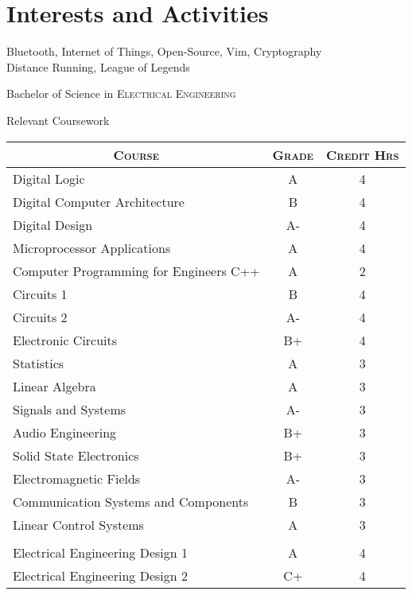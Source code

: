 \documentclass[a4paper,10pt]{article} %
\begin{document}
\section{Interests and Activities}

Bluetooth, Internet of Things, Open-Source, Vim, Cryptography\\
Distance Running, League of Legends


\newpage


\par{\centering\Large \hypertarget{grds}{Bachelor of Science in \textsc{Electrical Engineering}}\par}\large{\centering Relevant Coursework\par}\normalsize

\begin{center}
\begin{tabular}{lcc}
\multicolumn{1}{c}{\textsc{Course}} & \textsc{Grade}&\textsc{Credit Hrs}\\ \hline
Digital Logic & A & 4\\
Digital Computer Architecture & B & 4\\
Digital Design & A- & 4\\
Microprocessor Applications & A & 4\\
Computer Programming for Engineers C++ & A & 2\\
Circuits 1 & B & 4\\
Circuits 2 & A- & 4 \\
Electronic Circuits & B+ & 4\\
Statistics & A & 3\\
Linear Algebra & A & 3\\
Signals and Systems & A- & 3\\
Audio Engineering & B+ & 3\\
Solid State Electronics & B+ & 3\\
Electromagnetic Fields & A- & 3\\
Communication Systems and Components & B & 3\\
Linear Control Systems & A & 3\\ \\
Electrical Engineering Design 1 & A & 4\\
Electrical Engineering Design 2 & C+ & 4\\

\end{tabular}
\end{center}
\end{document}
